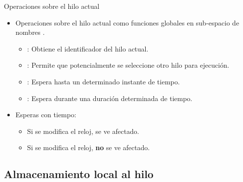 \begin{frame}{Operaciones sobre el hilo actual}
\begin{itemize}
  \item Operaciones sobre el hilo actual como funciones globales en sub-espacio de nombres .
    \begin{itemize}
      \item {}: Obtiene el identificador del hilo actual.
      \item {}: Permite que potencialmente se seleccione otro hilo para ejecución.
      \item {}: Espera hasta un determinado instante de tiempo.
      \item {}: Espera durante una duración determinada de tiempo.
    \end{itemize}
  \item Esperas con tiempo:
    \begin{itemize}
      \item Si se modifica el reloj,  se ve afectado.
      \item Si se modifica el reloj,  \textbf{no} se ve afectado.
    \end{itemize}
\end{itemize}
\end{frame}

\subsection{Almacenamiento local al hilo}

